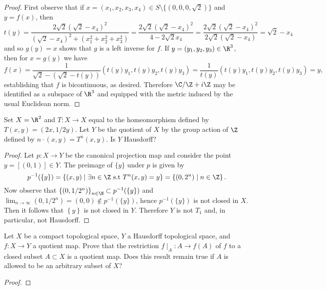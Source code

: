 \documentclass[10pt]{amsart}
\begin{document}
\begin{thm}
\begin{proof}
    First observe that if $x = (x_1, x_2, x_3, x_4) \in S \setminus \{(0,0,0,\sqrt{2})\}$ and $y = f(x)$, then
    $$t(y) = \frac{2\sqrt{2}(\sqrt{2} - x_4)^2}{(\sqrt{2} - x_4)^2 + (x_1^2 + x_2^2 + x_3^2)} = \frac{2\sqrt{2}(\sqrt{2} - x_4)^2}{4 - 2\sqrt{2}x_4} = \frac{2\sqrt{2}(\sqrt{2} - x_4)^2}{2\sqrt{2}(\sqrt{2} -x_4)} = \sqrt{2} - x_4$$
    and so $g(y) = x$ shows that $g$ is a left inverse for $f$.
    If $y = (y_1, y_2, y_3) \in \R^3$, then for $x = g(y)$ we have
    $$f(x) = \frac{1}{\sqrt{2} - (\sqrt{2} - t(y))}(t(y)y_1, t(y)y_2, t(y)y_3) = \frac{1}{t(y)}(t(y)y_1, t(y)y_2, t(y)y_3) = y,$$
    establishing that $f$ is bicontinuous, as desired.
    Therefore $\C/\Z +i\Z$ may be identified as a subspace of $\R^3$ and equipped with the metric induced by the usual Euclidean norm.		
  \end{proof}
\end{thm}

\begin{thm}\label{ex3}
  Set $X = \R^2$ and $T \colon X \rightarrow X$ equal to the homeomorphism defined by $T(x,y) = (2x, 1/2y)$.
  Let $Y$ be the quotient of $X$ by the group action of $\Z$ defined by $n \cdot (x,y) = T^n(x,y)$.
  Is $Y$ Hausdorff?
  
  \begin{proof}
    Let $p \colon X \rightarrow Y$ be the canonical projection map and consider the point $y = [(0,1)] \in Y$.
    The preimage of $\{y\}$ under $p$ is given by
    $$p^{-1}(\{y\}) = \left\{(x,y) \;\middle\vert\; \exists n \in \Z\ \text{s.t}\ T^{n}(x,y) = y\right\} = \left\{(0, 2^{n}) \;\middle\vert\; n \in \Z\right\}.$$
    Now observe that $\left\{(0, 1/2^n)\right\}_{n \in \N} \subset p^{-1}(\{y\})$ and $\lim_{n \rightarrow \infty} (0, 1/2^n) = (0,0) \not \in p^{-1}(\{y\})$, hence $p^{-1}(\{y\})$ is not closed in $X$.
    Then it follows that $\left\{y\right\}$ is not closed in $Y$.
    Therefore $Y$ is not $T_1$ and, in particular, not Hausdorff.
  \end{proof}
\end{thm}

\begin{thm}\label{ex4}
  Let $X$ be a compact topological space, $Y$ a Hausdorff topological space, and $f \colon X \rightarrow Y$ a quotient map.
  Prove that the restriction $f \mid_A \colon A \rightarrow f(A)$ of $f$ to a closed subset $A \subset X$ is a quotient map.
  Does this result remain true if $A$ is allowed to be an arbitrary subset of $X$?
  \begin{proof}
  \end{proof}
\end{thm}
\end{document}
